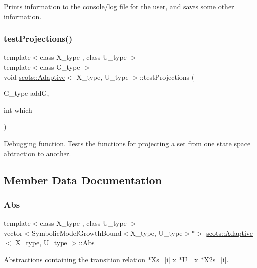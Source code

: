 Prints information to the console/log file for the user, and saves some other information. \mbox{\label{classscots_1_1Adaptive_a9a715bff15ed2365485cca7818c71479}} 
\subsubsection{\texorpdfstring{test\+Projections()}{testProjections()}}
{\footnotesize\ttfamily template$<$class X\+\_\+type , class U\+\_\+type $>$ \\
template$<$class G\+\_\+type $>$ \\
void \hyperlink{classscots_1_1Adaptive}{scots\+::\+Adaptive}$<$ X\+\_\+type, U\+\_\+type $>$\+::test\+Projections (\begin{DoxyParamCaption}\item[{G\+\_\+type}]{addG,  }\item[{int}]{which }\end{DoxyParamCaption})\hspace{0.3cm}{\ttfamily [inline]}}

Debugging function. Tests the functions for projecting a set from one state space abtraction to another. 

\subsection{Member Data Documentation}
\mbox{\label{classscots_1_1Adaptive_ab51fe5639ecc8fd046c1d2d56fb25890}} 
\subsubsection{\texorpdfstring{Abs\+\_\+}{Abs\_}}
{\footnotesize\ttfamily template$<$class X\+\_\+type , class U\+\_\+type $>$ \\
vector$<$Symbolic\+Model\+Growth\+Bound$<$X\+\_\+type, U\+\_\+type$>$$\ast$$>$ \hyperlink{classscots_1_1Adaptive}{scots\+::\+Adaptive}$<$ X\+\_\+type, U\+\_\+type $>$\+::Abs\+\_\+}

Abstractions containing the transition relation  $\ast$\+Xs\+\_\+\mbox{[}i\mbox{]} x $\ast$\+U\+\_\+ x $\ast$\+X2s\+\_\+\mbox{[}i\mbox{]}. \mbox{\label{classscots_1_1Adaptive_ad4f525a5a65b284da14369a54532cf39}} 
